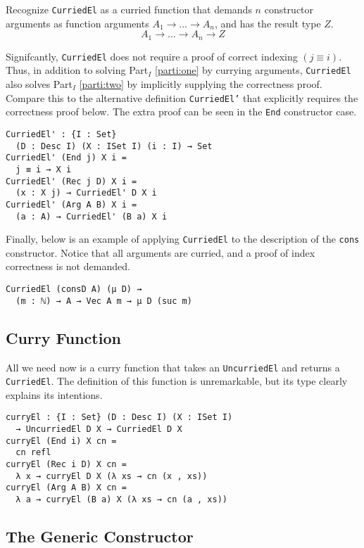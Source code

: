 \documentclass[preprint,nonatbib]{sigplanconf}
\newcommand{\refparti}[1]{Part$_I$ \ref{parti:#1}}
\begin{document}
Recognize {\tt CurriedEl} as a curried function that demands
$n$ constructor arguments as function arguments
$A_1 → ... → A_n$, and has the result type $Z$.
\[
A_1 → ... → A_n → Z
\]

Signifcantly, {\tt CurriedEl} does not require a proof of correct
indexing $(j≡i)$. Thus, in addition to solving \refparti{one} by
currying arguments, {\tt CurriedEl} also solves \refparti{two} by
implicitly supplying the correctness proof. Compare this to the
alternative definition {\tt CurriedEl'} that explicitly requires the
correctness proof below. The extra proof can be seen in the
{\tt End} constructor case.

\begin{verbatim}
CurriedEl' : {I : Set}
  (D : Desc I) (X : ISet I) (i : I) → Set
CurriedEl' (End j) X i =
  j ≡ i → X i
CurriedEl' (Rec j D) X i =
  (x : X j) → CurriedEl' D X i
CurriedEl' (Arg A B) X i =
  (a : A) → CurriedEl' (B a) X i
\end{verbatim}

Finally, below is an example of applying {\tt CurriedEl} to the
description of the {\tt cons} constructor. Notice that all arguments
are curried, and a proof of index correctness is not demanded.

\begin{verbatim}
CurriedEl (consD A) (μ D) ⇝
  (m : ℕ) → A → Vec A m → μ D (suc m)
\end{verbatim}

\subsection{Curry Function}

All we need now is a curry function that takes an
{\tt UncurriedEl} and returns a {\tt CurriedEl}. The definition of
this function is unremarkable, but its type clearly explains its
intentions.

\begin{verbatim}
curryEl : {I : Set} (D : Desc I) (X : ISet I)
  → UncurriedEl D X → CurriedEl D X
curryEl (End i) X cn =
  cn refl
curryEl (Rec i D) X cn =
  λ x → curryEl D X (λ xs → cn (x , xs))
curryEl (Arg A B) X cn =
  λ a → curryEl (B a) X (λ xs → cn (a , xs))
\end{verbatim}

\subsection{The Generic Constructor}
\end{document}
